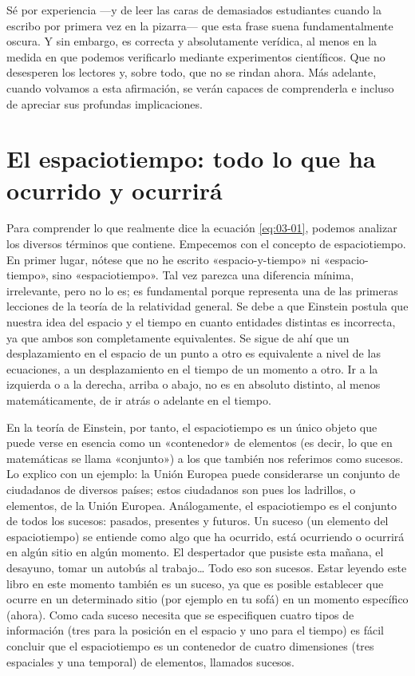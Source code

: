 
Sé por experiencia —y de leer las caras de demasiados estudiantes cuando la escribo por primera
vez en la pizarra— que esta frase suena fundamentalmente oscura. Y sin embargo, es correcta y
absolutamente verídica, al menos en la medida en que podemos verificarlo mediante experimentos
científicos. Que no desesperen los lectores y, sobre todo, que no se rindan ahora. Más
adelante, cuando volvamos a esta afirmación, se verán capaces de comprenderla e incluso de
apreciar sus profundas implicaciones.

\section[El espaciotiempo]{El espaciotiempo: todo lo que ha ocurrido y ocurrirá}\label{sec:03-spacetime}

Para comprender lo que realmente dice la ecuación \eqref{eq:03-01}, podemos analizar los
diversos términos que contiene. Empecemos con el concepto de espaciotiempo. En primer lugar,
nótese que no he escrito «espacio-y-tiempo» ni «espacio-tiempo», sino «espaciotiempo». Tal vez
parezca una diferencia mínima, irrelevante, pero no lo es; es fundamental porque representa una
de las primeras lecciones de la teoría de la relatividad general. Se debe a que Einstein
postula que nuestra idea del espacio y el tiempo en cuanto entidades distintas es incorrecta,
ya que ambos son completamente equivalentes. Se sigue de ahí que un desplazamiento en el
espacio de un punto a otro es equivalente a nivel de las ecuaciones, a un desplazamiento en el
tiempo de un momento a otro. Ir a la izquierda o a la derecha, arriba o abajo, no es en
absoluto distinto, al menos matemáticamente, de ir atrás o adelante en el tiempo.

En la teoría de Einstein, por tanto, el espaciotiempo es un único objeto que puede verse en
esencia como un «contenedor» de elementos (es decir, lo que en matemáticas se llama «conjunto»)
a los que también nos referimos como sucesos. Lo explico con un ejemplo: la Unión Europea puede
considerarse un conjunto de ciudadanos de diversos países; estos ciudadanos son pues los
ladrillos, o elementos, de la Unión Europea. Análogamente, el espaciotiempo es el conjunto de
todos los sucesos: pasados, presentes y futuros. Un suceso (un elemento del espaciotiempo) se
entiende como algo que ha ocurrido, está ocurriendo o ocurrirá en algún sitio en algún momento.
El despertador que pusiste esta mañana, el desayuno, tomar un autobús al trabajo… Todo eso son
sucesos. Estar leyendo este libro en este momento también es un suceso, ya que es posible
establecer que ocurre en un determinado sitio (por ejemplo en tu sofá) en un momento específico
(ahora). Como cada suceso necesita que se especifiquen cuatro tipos de información (tres para
la posición en el espacio y uno para el tiempo) es fácil concluir que el espaciotiempo es un
contenedor de cuatro dimensiones (tres espaciales y una temporal) de elementos, llamados
sucesos.

